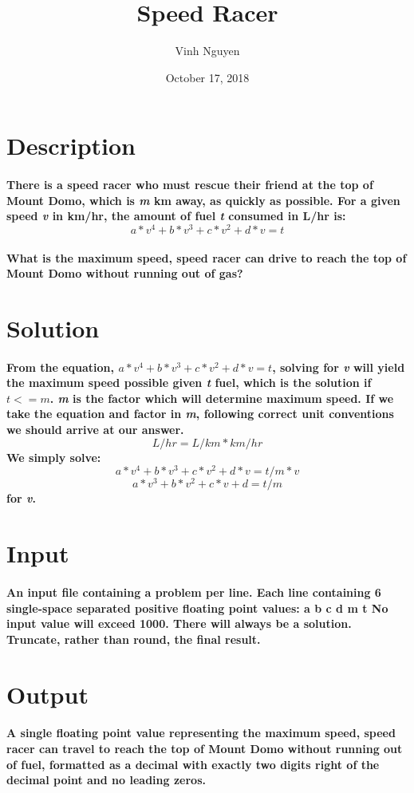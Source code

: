 \documentclass[12pt, oneside, a4paper]{article}
\begin{document}
\title{Speed Racer}
\author{Vinh Nguyen}
\date{October 17, 2018}
\maketitle
\newpage

\section*{Description}
	\paragraph{
		There is a speed racer who must rescue their friend at the top of Mount Domo,
		which is \emph{m} km away, as quickly as possible.  For a given speed 
		\emph{v} in km/hr, the amount of fuel \emph{t} consumed in L/hr is: 
		$$a*v^4 + b*v^3 + c*v^2 + d*v = t$$
	}
	\paragraph{
		What is the maximum speed, speed racer can drive to reach the top of Mount
		Domo without running out of gas?
	}
	
\section*{Solution}
	\paragraph{
		From the equation, $a*v^4 + b*v^3 + c*v^2 + d*v = t$, solving for \emph{v}
		will yield the maximum speed possible given \emph{t} fuel, which is the
		solution if $t <= m$.
		\hspace{0pt}
		\emph{m} is the factor which will determine maximum speed.  If we take the
		equation and factor in \emph{m}, following correct unit conventions we should
		arrive at our answer.
		$$L/hr = L/km * km/hr$$
		We simply solve: $$a*v^4 + b*v^3 + c*v^2 + d*v = t/m * v$$
						 $$a*v^3 + b*v^2 + c*v + d = t/m$$
		for \emph{v}.
	}

\section*{Input}
	\paragraph{
		An input file containing a problem per line.\hspace{0pt}
		Each line containing 6 single-space separated positive floating point values:
		a b c d m t
		No input value will exceed 1000.  
		There will always be a solution.
		Truncate, rather than round, the final result.
	}	

\section*{Output}
	\paragraph{
		A single floating point value representing the maximum speed, speed racer can
		travel to reach the top of Mount Domo without running out of fuel, formatted
		as a decimal with exactly two digits right of the decimal point and no leading
		zeros.
	}
	
\end{document}
